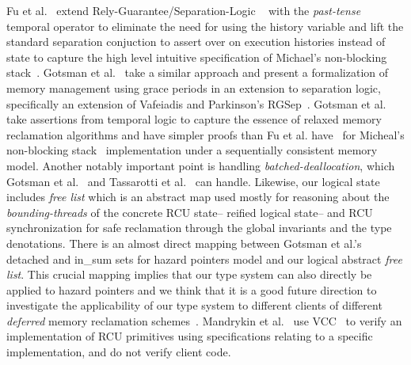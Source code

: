  Fu et al.~\cite{shao_temp} extend Rely-Guarantee/Separation-Logic ~\cite{vafeiadis07,Feng:2007:RCS:1762174.1762193,Feng:2009:LRR:1480881.1480922} with the \textit{past-tense} temporal operator to eliminate the need for using the history variable and lift the standard separation conjuction to assert over on execution histories instead of state to capture the high level intuitive specification of Michael's non-blocking stack~\cite{Michael:2004:HPS:987524.987595}. Gotsman et al.~\cite{Gotsman:2013:VCM:2450268.2450289} take a similar approach and present a formalization of memory management using grace periods in an extension to separation logic, specifically an extension of Vafeiadis and Parkinson's \textsf{RGSep}~\cite{vafeiadis07}. Gotsman et al. take assertions from temporal logic to capture the essence of relaxed memory reclamation algorithms and have simpler proofs than Fu et al. have~\cite{shao_temp} for Micheal's non-blocking stack~\cite{Michael:2004:HPS:987524.987595} implementation under a sequentially consistent memory model. Another notably important point is handling \textit{batched-deallocation}, which Gotsman et al.~\cite{Gotsman:2013:VCM:2450268.2450289} and Tassarotti et al.~\cite{verrcu} can handle. Likewise, our logical state includes \textit{free list} which is an abstract map used mostly for reasoning about the \textit{bounding-threads} of the concrete RCU state-- reified logical state-- and RCU synchronization for safe reclamation through the global invariants and the type denotations. There is an almost direct mapping between Gotsman et al.'s \textsf{detached} and \textsf{in\_sum} sets for hazard pointers model and our logical abstract \textit{free list}. This crucial mapping implies that our type system can also directly be applied to hazard pointers and we think that it is a good future direction to investigate the applicability of our type system to different clients of different \textit{deferred} memory reclamation schemes~\cite{Wen:2018:IMR:3178487.3178488,Michael:2004:HPS:987524.987595,Mckenney:2004:EDD:1048173,UCAM-CL-TR-579}. Mandrykin et al.~\cite{Mandrykin:2016:TDV:3001219.3001297} use \textsf{VCC}~\cite{Cohen:2009:VPS:1616077.1616080} to verify an implementation of RCU primitives using specifications relating to a specific implementation, and do not verify client code.

